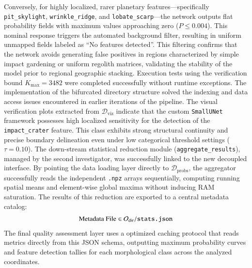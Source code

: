 \documentclass{aa}
\begin{document}
Conversely, for highly localized, rarer planetary features---specifically \texttt{pit\_skylight}, \texttt{wrinkle\_ridge}, and \texttt{lobate\_scarp}---the network outputs flat probability fields with maximum values approaching zero ($P \le 0.004$). This nominal response triggers the automated background filter, resulting in uniform unmapped fields labeled as ``No features detected''. This filtering confirms that the network avoids generating false positives in regions characterized by simple impact gardening or uniform regolith matrices, validating the stability of the model prior to regional geographic stacking.
Execution tests using the verification bound $K_{\text{max}} = 3482$ were completed successfully without runtime exceptions. The implementation of the bifurcated directory structure solved the indexing and data access issues encountered in earlier iterations of the pipeline.
The visual verification plots extracted from $\mathcal{D}_{\text{viz}}$ indicate that the custom \texttt{SmallUNet} framework possesses high localized sensitivity for the detection of the \texttt{impact\_crater} feature. This class exhibits strong structural continuity and precise boundary delineation even under low categorical threshold settings ($\tau = 0.10$).
The down-stream statistical reduction module (\texttt{aggregate\_results}), managed by the second investigator, was successfully linked to the new decoupled interface. By pointing the data loading layer directly to $\mathcal{D}_{\text{probs}}$, the aggregator successfully reads the independent \texttt{.npz} arrays sequentially, computing running spatial means and element-wise global maxima without inducing RAM saturation. The results of this reduction are exported to a central metadata catalog:
\begin{equation*}
\text{Metadata File} \in \mathcal{O}_{\text{dir}} / \text{\texttt{stats.json}}
\end{equation*}
The final quality assessment layer uses a optimized caching protocol that reads metrics directly from this JSON schema, outputting maximum probability curves and feature detection tallies for each morphological class across the analyzed coordinates.
\end{document}
